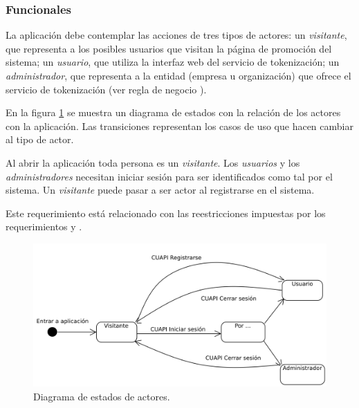 %
%

\subsubsection{Funcionales}


{
  La aplicación debe contemplar las acciones de tres tipos de actores: un
  \textit{visitante}, que representa a los posibles usuarios que visitan la
  página de promoción del sistema; un \textit{usuario}, que utiliza la interfaz
  web del servicio de tokenización; un \textit{administrador}, que representa a
  la entidad (empresa u organización) que ofrece el servicio de tokenización
  (ver regla de negocio ).

  {
    En la figura \ref{estados_actores} se muestra un diagrama de estados con
    la relación de los actores con la aplicación. Las transiciones representan
    los casos de uso que hacen cambiar al tipo de actor.

    Al abrir la aplicación toda persona es un \textit{visitante}. Los
    \textit{usuarios} y los \textit{administradores} necesitan iniciar sesión
    para ser identificados como tal por el sistema. Un \textit{visitante} puede
    pasar a ser actor al registrarse en el sistema.

    Este requerimiento está relacionado con las reestricciones impuestas por los
    requerimientos  y
    .
  }
}


\begin{figure}
  \begin{center}
    \includegraphics[width=0.8\linewidth]{diagramas/flujo_de_actores.png}
    \caption{Diagrama de estados de actores.}
    \label{estados_actores}
  \end{center}
\end{figure}

